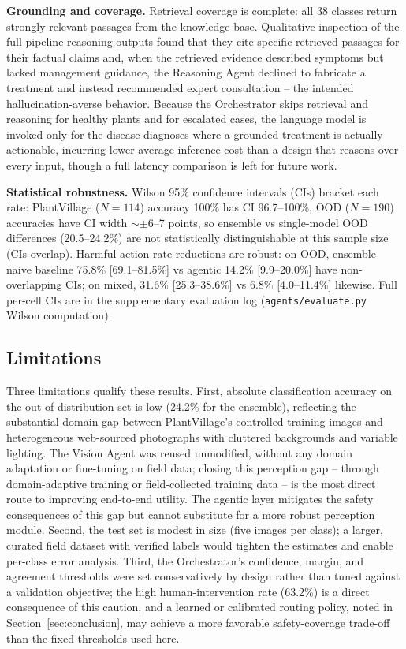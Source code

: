 \documentclass[conference]{IEEEtran}
\begin{document}
\textbf{Grounding and coverage.} Retrieval coverage is complete: all 38 classes return strongly relevant passages from the knowledge base. Qualitative inspection of the full-pipeline reasoning outputs found that they cite specific retrieved passages for their factual claims and, when the retrieved evidence described symptoms but lacked management guidance, the Reasoning Agent declined to fabricate a treatment and instead recommended expert consultation -- the intended hallucination-averse behavior. Because the Orchestrator skips retrieval and reasoning for healthy plants and for escalated cases, the language model is invoked only for the disease diagnoses where a grounded treatment is actually actionable, incurring lower average inference cost than a design that reasons over every input, though a full latency comparison is left for future work.


\textbf{Statistical robustness.} Wilson 95\% confidence intervals (CIs) bracket each rate: PlantVillage ($N=114$) accuracy 100\% has CI 96.7--100\%, OOD ($N=190$) accuracies have CI width $\sim\pm6$--7 points, so ensemble vs single-model OOD differences (20.5--24.2\%) are not statistically distinguishable at this sample size (CIs overlap). Harmful-action rate reductions are robust: on OOD, ensemble naive baseline 75.8\% [69.1--81.5\%] vs agentic 14.2\% [9.9--20.0\%] have non-overlapping CIs; on mixed, 31.6\% [25.3--38.6\%] vs 6.8\% [4.0--11.4\%] likewise. Full per-cell CIs are in the supplementary evaluation log (\texttt{agents/evaluate.py} Wilson computation).

\subsection{Limitations}
Three limitations qualify these results. First, absolute classification accuracy on the out-of-distribution set is low (24.2\% for the ensemble), reflecting the substantial domain gap between PlantVillage's controlled training images and heterogeneous web-sourced photographs with cluttered backgrounds and variable lighting. The Vision Agent was reused unmodified, without any domain adaptation or fine-tuning on field data; closing this perception gap -- through domain-adaptive training or field-collected training data -- is the most direct route to improving end-to-end utility. The agentic layer mitigates the safety consequences of this gap but cannot substitute for a more robust perception module. Second, the test set is modest in size (five images per class); a larger, curated field dataset with verified labels would tighten the estimates and enable per-class error analysis. Third, the Orchestrator's confidence, margin, and agreement thresholds were set conservatively by design rather than tuned against a validation objective; the high human-intervention rate (63.2\%) is a direct consequence of this caution, and a learned or calibrated routing policy, noted in Section~\ref{sec:conclusion}, may achieve a more favorable safety-coverage trade-off than the fixed thresholds used here.
\end{document}
